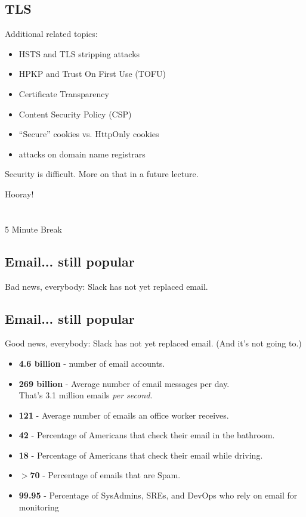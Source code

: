 \documentclass[xga]{xdvislides}
\begin{document}
\subsection{TLS}
Additional related topics:
\begin{itemize}
	\item HSTS and TLS stripping attacks
	\item HPKP and Trust On First Use (TOFU)
	\item Certificate Transparency
	\item Content Security Policy (CSP)
	\item ``Secure'' cookies vs. HttpOnly cookies
	\item attacks on domain name registrars
\end{itemize}
\addvspace{.5in}
Security is difficult.  More on that in a future
lecture.


\newpage
\vspace*{\fill}
\begin{center}
    \Hugesize
        Hooray! \\ [1em]
    \hspace*{5mm}
    \blueline\\
    \hspace*{5mm}\\
        5 Minute Break
\end{center}
\vspace*{\fill}

\subsection{Email... still popular}
Bad news, everybody: Slack has not yet replaced email.

\subsection{Email... still popular}
Good news, everybody: Slack has not yet replaced email. (And it's not going to.)
\\

\begin{itemize}
	\item {\bf 4.6 billion} - number of email accounts.
	\item {\bf 269 billion} - Average number of email messages per day. \\
		That's 3.1 million emails {\em per second}.
	\item {\bf 121} - Average number of emails an office worker receives.
	\item {\bf 42} - Percentage of Americans that check their email in the bathroom.
	\item {\bf 18} - Percentage of Americans that check their email while driving.
	\item {\bf $>$70} - Percentage of emails that are Spam.
	\item {\bf 99.95} - Percentage of SysAdmins, SREs, and DevOps who rely on email for monitoring
\end{itemize}
\end{document}
